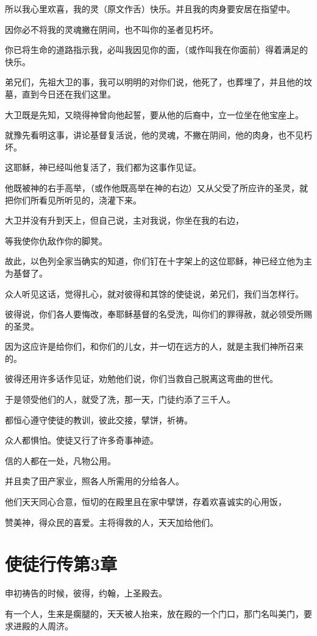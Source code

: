 \documentclass[12pt,oneside]{book}
\begin{document}
所以我心里欢喜，我的灵（原文作舌）快乐。并且我的肉身要安居在指望中。

因你必不将我的灵魂撇在阴间，也不叫你的圣者见朽坏。

你已将生命的道路指示我，必叫我因见你的面，（或作叫我在你面前）得着满足的快乐。

弟兄们，先祖大卫的事，我可以明明的对你们说，他死了，也葬埋了，并且他的坟墓，直到今日还在我们这里。

大卫既是先知，又晓得神曾向他起誓，要从他的后裔中，立一位坐在他宝座上。

就豫先看明这事，讲论基督复活说，他的灵魂，不撇在阴间，他的肉身，也不见朽坏。

这耶稣，神已经叫他复活了，我们都为这事作见证。

他既被神的右手高举，（或作他既高举在神的右边）又从父受了所应许的圣灵，就把你们所看见所听见的，浇灌下来。

大卫并没有升到天上，但自己说，主对我说，你坐在我的右边，

等我使你仇敌作你的脚凳。

故此，以色列全家当确实的知道，你们钉在十字架上的这位耶稣，神已经立他为主为基督了。

众人听见这话，觉得扎心，就对彼得和其馀的使徒说，弟兄们，我们当怎样行。

彼得说，你们各人要悔改，奉耶稣基督的名受洗，叫你们的罪得赦，就必领受所赐的圣灵。

因为这应许是给你们，和你们的儿女，并一切在远方的人，就是主我们神所召来的。

彼得还用许多话作见证，劝勉他们说，你们当救自己脱离这弯曲的世代。

于是领受他们的人，就受了洗，那一天，门徒约添了三千人。

都恒心遵守使徒的教训，彼此交接，擘饼，祈祷。

众人都惧怕。使徒又行了许多奇事神迹。

信的人都在一处，凡物公用。

并且卖了田产家业，照各人所需用的分给各人。

他们天天同心合意，恒切的在殿里且在家中擘饼，存着欢喜诚实的心用饭，

赞美神，得众民的喜爱。主将得救的人，天天加给他们。

\chapter{使徒行传第3章}
申初祷告的时候，彼得，约翰，上圣殿去。

有一个人，生来是瘸腿的，天天被人抬来，放在殿的一个门口，那门名叫美门，要求进殿的人周济。
\end{document}
